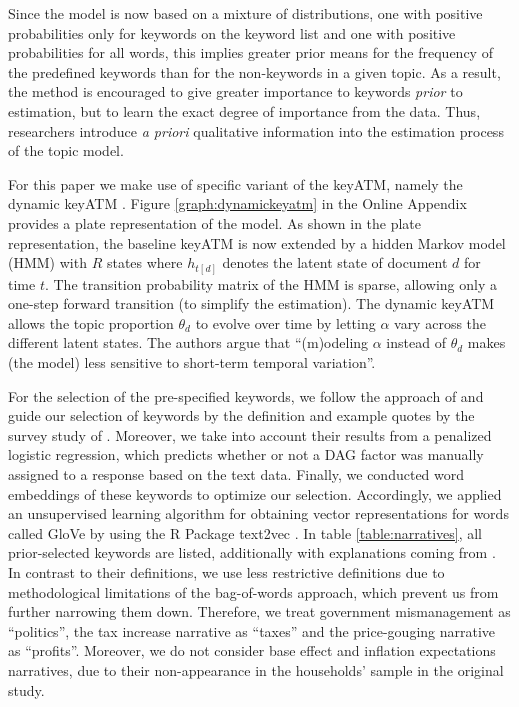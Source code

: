 Since the model is now based on a mixture of distributions, one with positive probabilities only for keywords on the keyword list and one with positive probabilities for all words, this implies greater prior means for the frequency of the predefined keywords than for the non-keywords in a given topic. As a result, the method is encouraged to give greater importance to keywords \textit{prior} to estimation, but to learn the exact degree of importance from the data. Thus, researchers introduce \textit{a priori} qualitative information into the estimation process of the topic model. 

For this paper we make use of specific variant of the \textsf{keyATM}, namely the \textsf{dynamic keyATM} \citep[22 ff.]{Eshima.2020}. Figure \ref{graph:dynamickeyatm} in the Online Appendix provides a plate representation of the model. As shown in the plate representation, the baseline \textsf{keyATM} is now extended by a hidden Markov model (HMM) with $R$ states where $h_{t[d]}$ denotes the latent state of document $d$ for time $t$. The transition probability matrix of the HMM is sparse, allowing only a one-step forward transition (to simplify the estimation). The \textsf{dynamic keyATM} allows the topic proportion $\theta_d$ to evolve over time by letting $\alpha$ vary across the different latent states. The authors argue that ``(m)odeling $\alpha$ instead of $\theta_d$ makes (the model) less sensitive to short-term temporal variation''. 

For the selection of the pre-specified keywords, we follow the approach of \cite{Eshima.2023} and guide our selection of keywords by the definition and example quotes by the survey study of \cite{Andre.2023}. Moreover, we take into account their results from a penalized logistic regression, which predicts whether or not a DAG factor was manually assigned to a response based on the text data. Finally, we conducted word embeddings of these keywords to optimize our selection. Accordingly, we applied an unsupervised learning algorithm for obtaining vector representations for words called GloVe by using the R Package \textsf{text2vec} \citep{text2vec.2022}. In table \ref{table:narratives}, all prior-selected keywords are listed, additionally with explanations coming from \cite{Andre.2023}. In contrast to their definitions, we use less restrictive definitions due to methodological limitations of the bag-of-words approach, which prevent us from further narrowing them down. Therefore, we treat government mismanagement as ``politics'', the tax increase narrative as ``taxes'' and the price-gouging narrative as ``profits''. Moreover, we do not consider base effect and inflation expectations narratives, due to their non-appearance in the households' sample in the original study. 

